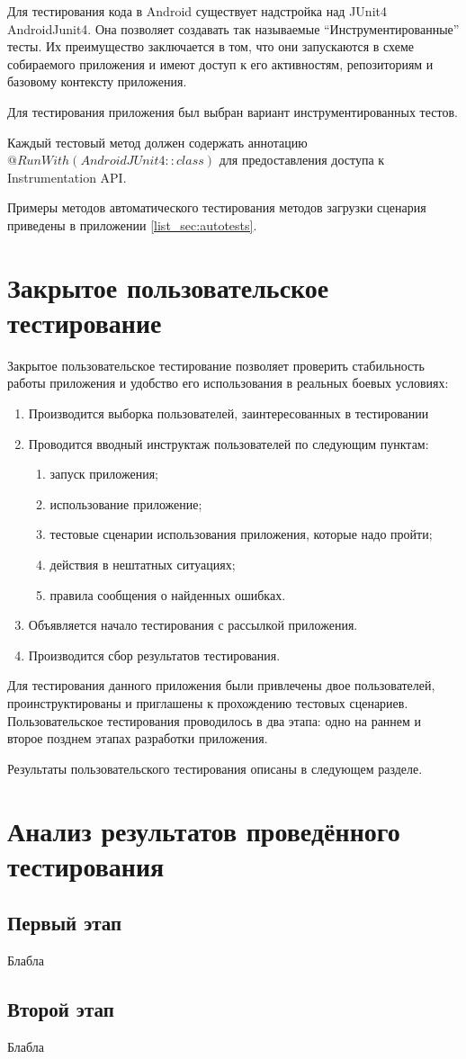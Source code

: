 Для тестирования кода в Android существует надстройка над JUnit4 \textemdash\space AndroidJunit4. Она позволяет создавать так называемые ``Инструментированные'' тесты. Их преимущество заключается в том, что они запускаются в схеме собираемого приложения и имеют доступ к его активностям, репозиториям и базовому контексту приложения.

Для тестирования приложения был выбран вариант инструментированных тестов.

Каждый тестовый метод должен содержать аннотацию $@RunWith(AndroidJUnit4::class)$ для предоставления доступа к Instrumentation API.

Примеры методов автоматического тестирования методов загрузки сценария приведены в приложении \ref{list_sec:autotests}.

\section{Закрытое пользовательское тестирование}
\label{sec:usertesting}
Закрытое пользовательское тестирование позволяет проверить стабильность работы приложения и удобство его использования в реальных боевых условиях:
\begin{enumerate}
	\item Производится выборка пользователей, заинтересованных в тестировании
	\item Проводится вводный инструктаж пользователей по следующим пунктам:
	\begin{enumerate}
		\item запуск приложения;
		\item использование приложение;
		\item тестовые сценарии использования приложения, которые надо пройти;
		\item действия в нештатных ситуациях;
		\item правила сообщения о найденных ошибках.
	\end{enumerate}
	\item Объявляется начало тестирования с рассылкой приложения.
	\item Производится сбор результатов тестирования.
\end{enumerate}

Для тестирования данного приложения были привлечены двое пользователей, проинструктированы и приглашены к прохождению тестовых сценариев.
Пользовательское тестирования проводилось в два этапа: одно на раннем и второе позднем этапах разработки приложения.

Результаты пользовательского тестирования описаны в следующем разделе.

\section{Анализ результатов проведённого тестирования}
\subsection*{Первый этап}
Блабла

\subsection*{Второй этап}
Блабла